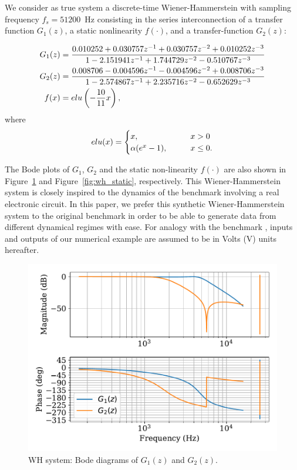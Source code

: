 \documentclass{ifacconf}
\begin{document}
We consider as true system a discrete-time Wiener-Hammerstein with sampling frequency $f_s=51200$~Hz consisting in the series interconnection of a transfer function $G_1(z)$, a static nonlinearity $f(\cdot)$, and a transfer-function $G_2(z)$:
\begin{small}
\begin{align*}
 G_1(z) &= \frac{0.010252 + 0.030757z^{-1} + 0.030757z^{-2} + 0.010252z^{-3}}{ 1 -2.151941z^{-1} + 1.744729z^{-2} -0.510767z^{-3}}\\
 G_2(z) &= \frac{0.008706 -0.004596z^{-1} - 0.004596z^{-2} + 0.008706z^{-3}}{1 -2.574867z^{-1} + 2.235716z^{-2} -0.652629z^{-3}}\\
 f(x) &= {\rm elu}\left (-\frac{10}{11}x \right ),
 \end{align*}
where 
\begin{equation*}
 {\rm elu}(x) = \begin{cases}
                 x, \qquad  &x  > 0\\
                 \alpha (e^x-1), \qquad &x \leq 0.
                \end{cases}
\end{equation*}
\end{small}
The Bode plots of $G_1$, $G_2$ and the static non-linearity $f(\cdot)$ are also shown in Figure~\ref{fig:wh_bode} and Figure~\ref{fig:wh_static}, respectively.
{
This Wiener-Hammerstein system is closely inspired to the dynamics of the benchmark \cite{schoukens2009wiener} involving a real electronic circuit. In this paper, we prefer this synthetic Wiener-Hammerstein system to the original benchmark in order to be able to generate data from different dynamical regimes with ease.} %
{For analogy with the benchmark \cite{schoukens2009wiener}, inputs and outputs of our numerical example are assumed to be in Volts (V) units hereafter.}
\begin{figure}
 \centering
 \includegraphics[width=.8\linewidth]{img/wh_bode.pdf}
 \caption{WH system: Bode diagrams of $G_1(z)$ and $G_2(z)$.}
 \label{fig:wh_bode}
\end{figure}
\end{document}
